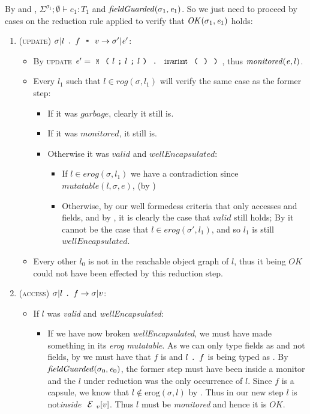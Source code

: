 By  and ,
$\Sigma^{\sigma_1};\emptyset\vdash e_1: T_1$ and  $\mathit{fieldGuarded}(\sigma_1,{\mathit{e}}_1)$. So we just need to proceed by cases on the reduction rule applied to verify that $\mathit{OK}(\sigma_1,{\mathit{e}}_1)$ holds:
\begin{enumerate}
\item (\textsc{update}) $\sigma|l\singleDot f\equals v\rightarrow \sigma'|\e'$:
	\begin{itemize}
	  \item By \textsc{update} $\e'=\M{l}{l}{l}\singleDot\Kw{invariant}\oR\cR\cR$, thus $\mathit{monitored}({\mathit{e}},l)$.
	  \item Every $l_1$ such that $l\in \mathit{rog}(\sigma,l_1)$ will verify the same case as the former step:
	  \begin{itemize}
	  	\item If it was $\mathit{garbage}$, clearly it still is.
	  	\item If it was $\mathit{monitored}$, it still is.
	    \item Otherwise it was $\mathit{valid}$ and $\mathit{wellEncapsulated}$:
			\begin{itemize}
				\item If $l\in \mathit{erog}(\sigma,l_1)$ we have a contradiction since $\mathit{mutatable}(l, \sigma, e)$, (by )
		    	\item Otherwise, by our well formedess criteria that \Q@invariant@ only accesses \Q@imm@ and \Q@capsule@ fields, and by , it is clearly the case that $\mathit{valid}$ still holds;
				By  it cannot be the case that $l\in \mathit{erog}(\sigma',l_1)$, and so $l_1$ is still $\mathit{wellEncapsulated}$.
		  	\end{itemize}
	  \end{itemize}
	  \item Every other $l_0$ is not in the reachable object graph of $l$,
	  thus it being $\mathit{OK}$ could not have been effected by this reduction step.
	\end{itemize}

\item (\textsc{access}) $\sigma|l{ \mbox{ {\texttt{.}} } } f \rightarrow \sigma|v$:
	\begin{itemize}
		\item If $l$ was \emph{valid} and \emph{wellEncapsulated}:
		\begin{itemize}
			\item If we have now broken \emph{wellEncapsulated}, we must have made something in its \emph{erog} \emph{mutatable}. As we can only type \Q@capsule@ fields as \Q@mut@ and not \Q@imm@ fields, by  we must have that $f$ is \Q@capsule@ and $l{ \mbox{ {\texttt{.}} } } f$ is being typed as \Q@mut@. By $\mathit{fieldGuarded}(\sigma_0,{\mathit{e}}_0)$, the former step must have been inside a monitor 
		    and the $l$ under reduction was the only occurrence of $l$.
		    Since $f$ is a capsule, we know that $l\notin \text{erog}(\sigma,l)$
		    by . Thus in our new step $l$ is not\emph{inside} $\ctx_v[v]$. Thus $l$ must be \emph{monitored} and hence it is $\mathit{OK}$.


\end{itemize}
\end{itemize}
\end{enumerate}
